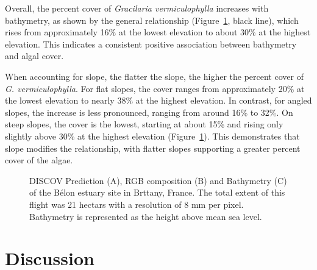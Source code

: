 \documentclass[
  letterpaper,
  DIV=11,
  numbers=noendperiod]{scrartcl}
\begin{document}
Overall, the percent cover of \emph{Gracilaria vermiculophylla}
increases with bathymetry, as shown by the general relationship
(Figure~\ref{fig-Gam_Slope}, black line), which rises from approximately
16\% at the lowest elevation to about 30\% at the highest elevation.
This indicates a consistent positive association between bathymetry and
algal cover.

When accounting for slope, the flatter the slope, the higher the percent
cover of \emph{G. vermiculophylla}. For flat slopes, the cover ranges
from approximately 20\% at the lowest elevation to nearly 38\% at the
highest elevation. In contrast, for angled slopes, the increase is less
pronounced, ranging from around 16\% to 32\%. On steep slopes, the cover
is the lowest, starting at about 15\% and rising only slightly above
30\% at the highest elevation (Figure~\ref{fig-Gam_Slope}). This
demonstrates that slope modifies the relationship, with flatter slopes
supporting a greater percent cover of the algae.

\label{cell-fig-Gam_Slope}
\begin{figure}[H]


\caption{\label{fig-Gam_Slope}DISCOV Prediction (A), RGB composition (B)
and Bathymetry (C) of the Bélon estuary site in Brttany, France. The
total extent of this flight was 21 hectars with a resolution of 8 mm per
pixel. Bathymetry is represented as the height above mean sea level.}

\end{figure}%

\section{Discussion}\label{discussion}
\end{document}
